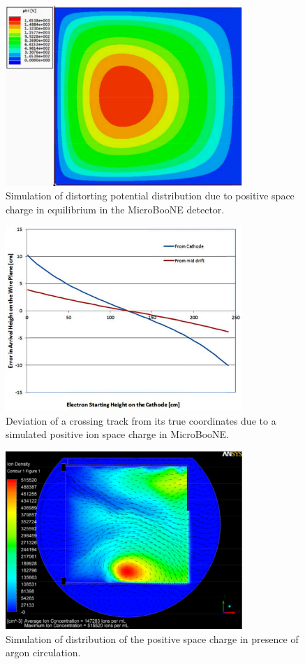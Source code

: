 \begin{figure}
\centering	
\includegraphics[width=0.8\textwidth]{figures/Potential.pdf}
\caption{Simulation of distorting potential distribution due to positive space charge in equilibrium in the MicroBooNE detector.}
\label{Ions}
\end{figure}

\begin{figure}
\centering	
\includegraphics[width=0.8\textwidth]{figures/Coordinate.pdf}
\caption{Deviation of a crossing track from its true coordinates due to a simulated positive ion space charge in MicroBooNE.}
\label{Coordinates}
\end{figure}

\begin{figure}
\centering	
\includegraphics[width=0.8\textwidth]{figures/Voirin.pdf}
\caption{Simulation of distribution of the positive space charge in presence of argon circulation.}
\label{Voirin}
\end{figure}


